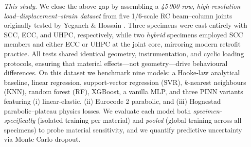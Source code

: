 \documentclass{article}
\begin{document}
\smallskip
\noindent\emph{This study.}  
We close the above gap by assembling a \emph{45\,000-row, high-resolution load–displacement–strain dataset} from five 1/6-scale RC beam–column joints originally tested by Yeganeh \& Hossain \cite{yeganeh2023shear}.  Three specimens were cast entirely with SCC, ECC, and UHPC, respectively, while two \emph{hybrid} specimens employed SCC members and either ECC or UHPC at the joint core, mirroring modern retrofit practice.  All tests shared identical geometry, instrumentation, and cyclic loading protocols, ensuring that material effects—not geometry—drive behavioural differences.  On this dataset we benchmark nine models: a Hooke-law analytical baseline, linear regression, support-vector regression (SVR), $k$-nearest neighbours (KNN), random forest (RF), XGBoost, a vanilla MLP, and three PINN variants featuring (i) linear-elastic, (ii) Eurocode 2 parabolic, and (iii) Hognestad parabolic–plateau physics losses.  We evaluate each model both \emph{specimen-specifically} (isolated training per material) and \emph{pooled} (global training across all specimens) to probe material sensitivity, and we quantify predictive uncertainty via Monte Carlo dropout.
\end{document}
